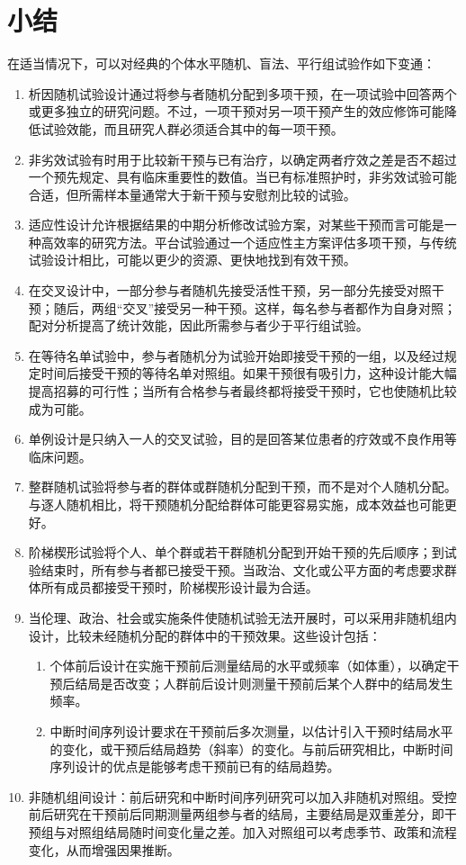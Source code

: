 \section{小结}
在适当情况下，可以对经典的个体水平随机、盲法、平行组试验作如下变通：
\begin{enumerate}
\item 析因随机试验设计通过将参与者随机分配到多项干预，在一项试验中回答两个或更多独立的研究问题。不过，一项干预对另一项干预产生的效应修饰可能降低试验效能，而且研究人群必须适合其中的每一项干预。
\item 非劣效试验有时用于比较新干预与已有治疗，以确定两者疗效之差是否不超过一个预先规定、具有临床重要性的数值。当已有标准照护时，非劣效试验可能合适，但所需样本量通常大于新干预与安慰剂比较的试验。
\item 适应性设计允许根据结果的中期分析修改试验方案，对某些干预而言可能是一种高效率的研究方法。平台试验通过一个适应性主方案评估多项干预，与传统试验设计相比，可能以更少的资源、更快地找到有效干预。
\item 在交叉设计中，一部分参与者随机先接受活性干预，另一部分先接受对照干预；随后，两组“交叉”接受另一种干预。这样，每名参与者都作为自身对照；配对分析提高了统计效能，因此所需参与者少于平行组试验。
\item 在等待名单试验中，参与者随机分为试验开始即接受干预的一组，以及经过规定时间后接受干预的等待名单对照组。如果干预很有吸引力，这种设计能大幅提高招募的可行性；当所有合格参与者最终都将接受干预时，它也使随机比较成为可能。
\item 单例设计是只纳入一人的交叉试验，目的是回答某位患者的疗效或不良作用等临床问题。
\item 整群随机试验将参与者的群体或群随机分配到干预，而不是对个人随机分配。与逐人随机相比，将干预随机分配给群体可能更容易实施，成本效益也可能更好。
\item 阶梯楔形试验将个人、单个群或若干群随机分配到开始干预的先后顺序；到试验结束时，所有参与者都已接受干预。当政治、文化或公平方面的考虑要求群体所有成员都接受干预时，阶梯楔形设计最为合适。
\item 当伦理、政治、社会或实施条件使随机试验无法开展时，可以采用非随机组内设计，比较未经随机分配的群体中的干预效果。这些设计包括：
\begin{enumerate}
\item 个体前后设计在实施干预前后测量结局的水平或频率（如体重），以确定干预后结局是否改变；人群前后设计则测量干预前后某个人群中的结局发生频率。
\item 中断时间序列设计要求在干预前后多次测量，以估计引入干预时结局水平的变化，或干预后结局趋势（斜率）的变化。与前后研究相比，中断时间序列设计的优点是能够考虑干预前已有的结局趋势。
\end{enumerate}
\item 非随机组间设计：前后研究和中断时间序列研究可以加入非随机对照组。受控前后研究在干预前后同期测量两组参与者的结局，主要结局是双重差分，即干预组与对照组结局随时间变化量之差。加入对照组可以考虑季节、政策和流程变化，从而增强因果推断。
\end{enumerate}


\endgroup
